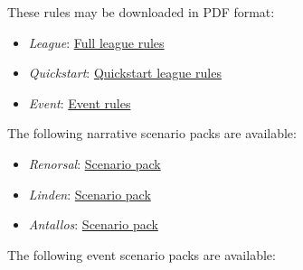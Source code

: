 These rules may be downloaded in PDF format:


\begin{itemize}

\item \emph{League}: \href{https://raw.githubusercontent.com/Eudicods/outworlds-wastes/rules-pdf/battletech-outworlds-wastes.pdf}{Full league rules}

\item \emph{Quickstart}: \href{https://raw.githubusercontent.com/Eudicods/outworlds-wastes/rules-pdf/battletech-outworlds-wastes-quickstart.pdf}{Quickstart league rules}

\item \emph{Event}: \href{https://raw.githubusercontent.com/Eudicods/outworlds-wastes/rules-pdf/battletech-outworlds-wastes-event.pdf}{Event rules}

\end{itemize}

The following narrative scenario packs are available:

\begin{itemize}

\item \emph{Renorsal}: \href{https://raw.githubusercontent.com/Eudicods/outworlds-wastes/rules-pdf/renorsal.pdf}{Scenario pack}

\item \emph{Linden}: \href{https://raw.githubusercontent.com/Eudicods/outworlds-wastes/rules-pdf/linden.pdf}{Scenario pack}

\item \emph{Antallos}: \href{https://raw.githubusercontent.com/Eudicods/outworlds-wastes/rules-pdf/antallos.pdf}{Scenario pack}

\end{itemize}

The following event scenario packs are available:

